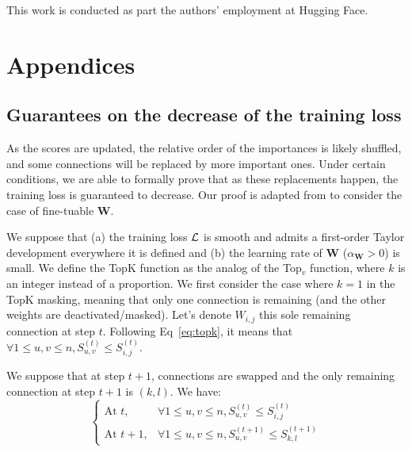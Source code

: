 \documentclass{article}
\begin{document}
\begin{ack}
This work is conducted as part the authors' employment at Hugging Face.
\end{ack}


 



\clearpage
\appendix



\section{Appendices}
\label{sec:appendix}


\subsection{Guarantees on the decrease of the training loss}
\label{sec:proof}

As the scores are updated, the relative order of the importances is likely shuffled, and some connections will be replaced by more important ones. Under certain conditions, we are able to formally prove that as these replacements happen, the training loss is guaranteed to decrease. Our proof is adapted from \citep{Ramanujan2019WhatsHI} to consider the case of fine-tuable $\mathbf{W}$.

We suppose that (a) the training loss $\cal L$ is smooth and admits a first-order Taylor development everywhere it is defined and (b) the learning rate of $\mathbf{W}$ ($\alpha_{\mathbf{W}}>0$) is small. We define the TopK function as the analog of the Top$_v$ function, where $k$ is an integer instead of a proportion. We first consider the case where $k=1$ in the TopK masking, meaning that only one connection is remaining (and the other weights are deactivated/masked). Let's denote $W_{i,j}$ this sole remaining connection at step $t$. Following Eq~\eqref{eq:topk}, it means that $\forall 1 \leq u,v \leq n, S^{(t)}_{u,v} \leq S^{(t)}_{i,j}$.

We suppose that at step $t+1$, connections are swapped and the only remaining connection at step $t+1$ is $(k,l)$. We have:
\begin{equation}
\label{eq:double_inequality}
    \begin{cases}
      \text{At $t$},   & \forall 1 \leq u,v \leq n, S^{(t)}_{u,v} \leq S^{(t)}_{i,j} \\
      \text{At $t+1$}, & \forall 1 \leq u,v \leq n, S^{(t+1)}_{u,v} \leq S^{(t+1)}_{k,l}
    \end{cases}
\end{equation}
\end{document}
